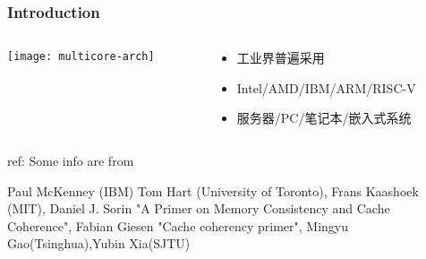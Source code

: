 %
%
\begin{frame}[plain]
	\frametitle{Introduction}
	
	
	
	\begin{columns}
		
		\begin{column}{.5\textwidth}
			\centering
			
			\texttt{[image: multicore-arch]}

		\end{column}
		
		\begin{column}{.5\textwidth}
			
			\Large

			\begin{itemize}
				\item 工业界普遍采用
				\item Intel/AMD/IBM/ARM/RISC-V
				\item 服务器/PC/笔记本/嵌入式系统
			
			\end{itemize}
			
		\end{column}
		
		
	\end{columns}
	
\tiny ref:
Some info are from

Paul McKenney (IBM) Tom Hart (University of Toronto), Frans Kaashoek (MIT), 
Daniel J. Sorin "A Primer on Memory Consistency and Cache Coherence", Fabian Giesen "Cache coherency primer", Mingyu Gao(Tsinghua),Yubin Xia(SJTU)
	
\end{frame}


